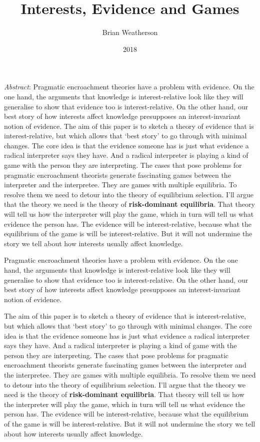 \documentclass[
  11pt,
  letterpaper,
  DIV=11,
  numbers=noendperiod,
  twoside]{scrartcl}
\title{Interests, Evidence and Games}
\author{Brian Weatherson}
\date{2018}
\renewenvironment{abstract}
 {\vspace{-1.25cm}
 \quotation\small\noindent\emph{Abstract}:}
 {\endquotation}
\begin{document}
\maketitle
\begin{abstract}
Pragmatic encroachment theories have a problem with evidence. On the one
hand, the arguments that knowledge is interest-relative look like they
will generalise to show that evidence too is interest-relative. On the
other hand, our best story of how interests affect knowledge presupposes
an interest-invariant notion of evidence. The aim of this paper is to
sketch a theory of evidence that is interest-relative, but which allows
that `best story' to go through with minimal changes. The core idea is
that the evidence someone has is just what evidence a radical
interpreter says they have. And a radical interpreter is playing a kind
of game with the person they are interpreting. The cases that pose
problems for pragmatic encroachment theorists generate fascinating games
between the interpreter and the interpretee. They are games with
multiple equilibria. To resolve them we need to detour into the theory
of equilibrium selection. I'll argue that the theory we need is the
theory of \textbf{risk-dominant equilibria}. That theory will tell us
how the interpreter will play the game, which in turn will tell us what
evidence the person has. The evidence will be interest-relative, because
what the equilibrium of the game is will be interest-relative. But it
will not undermine the story we tell about how interests usually affect
knowledge.
\end{abstract}


Pragmatic encroachment theories have a problem with evidence. On the one
hand, the arguments that knowledge is interest-relative look like they
will generalise to show that evidence too is interest-relative. On the
other hand, our best story of how interests affect knowledge presupposes
an interest-invariant notion of evidence.

The aim of this paper is to sketch a theory of evidence that is
interest-relative, but which allows that `best story' to go through with
minimal changes. The core idea is that the evidence someone has is just
what evidence a radical interpreter says they have. And a radical
interpreter is playing a kind of game with the person they are
interpreting. The cases that pose problems for pragmatic encroachment
theorists generate fascinating games between the interpreter and the
interpretee. They are games with multiple equilibria. To resolve them we
need to detour into the theory of equilibrium selection. I'll argue that
the theory we need is the theory of \textbf{risk-dominant equilibria}.
That theory will tell us how the interpreter will play the game, which
in turn will tell us what evidence the person has. The evidence will be
interest-relative, because what the equilibrium of the game is will be
interest-relative. But it will not undermine the story we tell about how
interests usually affect knowledge.
\end{document}
